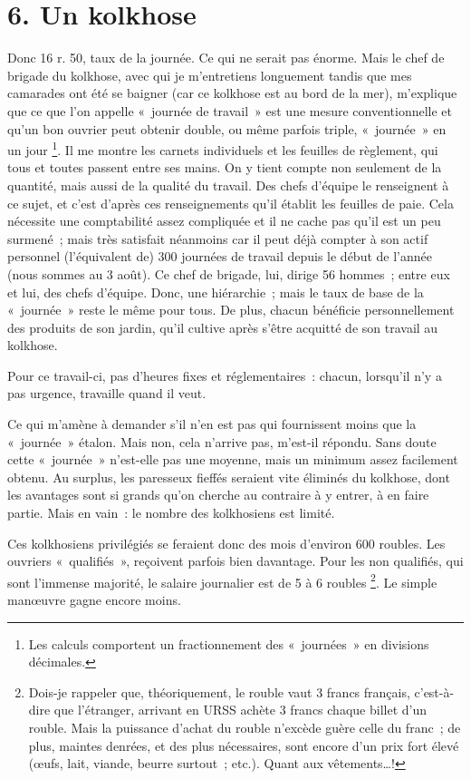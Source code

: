 \documentclass[french,twoside]{book} %
\begin{document}
\section[{6. Un kolkhose}]{6. Un kolkhose}

\noindent Donc 16 r. 50, taux de la journée. Ce qui ne serait pas énorme. Mais le chef de brigade du kolkhose, avec qui je m’entretiens longuement tandis que mes camarades ont été se baigner (car ce kolkhose est au bord de la mer), m’explique que ce que l’on appelle « journée de travail » est une mesure conventionnelle et qu’un bon ouvrier peut obtenir double, ou même parfois triple, « journée » en un jour \footnote{Les calculs comportent un fractionnement des « journées » en divisions décimales.}. Il me montre les carnets individuels et les feuilles de règlement, qui tous et toutes passent entre ses mains. On y tient compte non seulement de la quantité, mais aussi de la qualité du travail. Des chefs d’équipe le renseignent à ce sujet, et c’est d’après ces renseignements qu’il établit les feuilles de paie. Cela nécessite une comptabilité assez compliquée et il ne cache pas qu’il est un peu surmené ; mais très satisfait néanmoins car il peut déjà compter à son actif personnel (l’équivalent de) 300 journées de travail depuis le début de l’année (nous sommes au 3 août). Ce chef de brigade, lui, dirige 56 hommes ; entre eux et lui, des chefs d’équipe. Donc, une hiérarchie ; mais le taux de base de la « journée » reste le même pour tous. De plus, chacun bénéficie personnellement des produits de son jardin, qu’il cultive après s’être acquitté de son travail au kolkhose.\par
Pour ce travail-ci, pas d’heures fixes et réglementaires : chacun, lorsqu’il n’y a pas urgence, travaille quand il veut.\par
Ce qui m’amène à demander s’il n’en est pas qui fournissent moins que la « journée » étalon. Mais non, cela n’arrive pas, m’est-il répondu. Sans doute cette « journée » n’est-elle pas une moyenne, mais un minimum assez facilement obtenu. Au surplus, les paresseux fieffés seraient vite éliminés du kolkhose, dont les avantages sont si grands qu’on cherche au contraire à y entrer, à en faire partie. Mais en vain : le nombre des kolkhosiens est limité.\par
Ces kolkhosiens privilégiés se feraient donc des mois d’environ 600 roubles. Les ouvriers « qualifiés », reçoivent parfois bien davantage. Pour les non qualifiés, qui sont l’immense majorité, le salaire journalier est de 5 à 6 roubles \footnote{Dois-je rappeler que, théoriquement, le rouble vaut 3 francs français, c’est-à-dire que l’étranger, arrivant en URSS achète 3 francs chaque billet d’un rouble. Mais la puissance d’achat du rouble n’excède guère celle du franc ; de plus, maintes denrées, et des plus nécessaires, sont encore d’un prix fort élevé (œufs, lait, viande, beurre surtout ; etc.). Quant aux vêtements…!}. Le simple manœuvre gagne encore moins.\par
\end{document}
